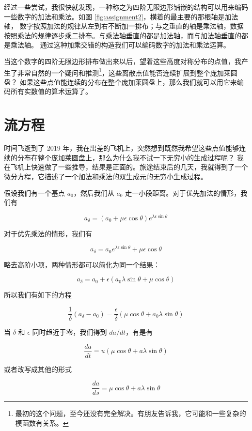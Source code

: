 \documentclass[a4paper,12pt]{book}
\numberwithin{problem}{section}
\numberwithin{definition}{section}
\numberwithin{lemma}{section}
\numberwithin{proposition}{section}
\numberwithin{theorem}{section}
\numberwithin{grammar}{section}
\numberwithin{program}{section}
\numberwithin{convention}{section}
\numberwithin{corollary}{section}
\begin{document}
经过一些尝试，我很快就发现，一种称之为四阶无限边形铺嵌的结构可以用来编码一些数字的加法和乘法。如图 \ref{fig:assignment2}，横着的最主要的那根轴是加法轴，
数字按照加法的规律从左到右不断加一排布；与之垂直的轴是乘法轴，数据按照乘法的规律逐步乘二排布。与乘法轴垂直的都是加法轴，而与加法轴垂直的都是乘法轴。
通过这种加乘交错的构造我们可以编码数字的加法和乘法运算。

当这个数字的四阶无限边形排布做出来以后，望着这些高度对称分布的点值，我产生了非常自然的一个疑问和推测\footnote{最初的这个问题，至今还没有完全解决。有朋友告诉我，它可能和一些复杂的模函数有关系。}，这些离散点值能否连续扩展到整个庞加莱圆盘？
如果这些点值能连续的分布在整个庞加莱圆盘上，那么我们就可以用它来编码所有实数值的算术运算了。

\section{流方程}

时间飞逝到了 2019 年，我在出差的飞机上，突然想到既然我希望这些点值能够连续的分布在整个庞加莱圆盘上，那么为什么我不试一下无穷小的生成过程呢？
我在飞机上快速做了一些推导，结果是正面的。旅途结束后的几天，我就得到了一个微分方程，它描述了一个加法和乘法的双生成元的无穷小生成过程。

假设我们有一个基点 $a_0$，然后我们从 $a_0$ 走一小段距离。对于优先加法的情形，我们有

\[
a_{\delta} = (a_0 + \mu \epsilon \cos \theta)e^{\lambda \epsilon \sin \theta}
\]

对于优先乘法的情形，我们有

\[
a_{\delta} = a_0 e^{\lambda \epsilon \sin \theta} + \mu \epsilon \cos \theta
\]

略去高阶小项，两种情形都可以简化为同一个结果：

\[
a_{\delta} = a_0 + \epsilon (a_0 \lambda \sin \theta + \mu \cos \theta)
\]

所以我们有如下的方程

\[
\frac{1}{\delta} (a_{\delta} - a_0) = \frac{\epsilon}{\delta} (\mu \cos \theta + a_0 \lambda \sin \theta)
\]

当 $\delta$ 和 $\epsilon$ 同时趋近于零，我们得到 $da / dt$，有是有

\[
\frac{da}{dt} = u (\mu \cos \theta + a \lambda \sin \theta)
\]

或者改写成其他的形式

\begin{equation}
\frac{da}{ds} = \mu \cos \theta + a \lambda \sin \theta\label{eq:flow}
\end{equation}
\end{document}
